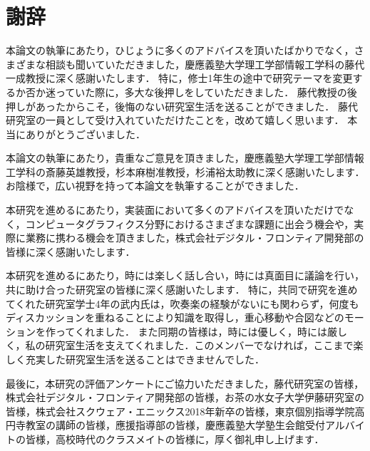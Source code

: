 \chapter*{謝辞}
\label{chap:thanks}
%
%
本論文の執筆にあたり，ひじょうに多くのアドバイスを頂いたばかりでなく，さまざまな相談も聞いていただきました，慶應義塾大学理工学部情報工学科の藤代一成教授に深く感謝いたします．
特に，修士1年生の途中で研究テーマを変更するか否か迷っていた際に，多大な後押しをしていただきました．
藤代教授の後押しがあったからこそ，後悔のない研究室生活を送ることができました．
藤代研究室の一員として受け入れていただけたことを，改めて嬉しく思います．
本当にありがとうございました．\\
\par
本論文の執筆にあたり，貴重なご意見を頂きました，慶應義塾大学理工学部情報工学科の斎藤英雄教授，杉本麻樹准教授，杉浦裕太助教に深く感謝いたします．
お陰様で，広い視野を持って本論文を執筆することができました．\\
\par
本研究を進めるにあたり，実装面において多くのアドバイスを頂いただけでなく，コンピュータグラフィクス分野におけるさまざまな課題に出会う機会や，実際に業務に携わる機会を頂きました，株式会社デジタル・フロンティア開発部の皆様に深く感謝いたします．\\
\par
本研究を進めるにあたり，時には楽しく話し合い，時には真面目に議論を行い，共に助け合った研究室の皆様に深く感謝いたします．
特に，共同で研究を進めてくれた研究室学士4年の武内氏は，吹奏楽の経験がないにも関わらず，何度もディスカッションを重ねることにより知識を取得し，重心移動や合図などのモーションを作ってくれました．
また同期の皆様は，時には優しく，時には厳しく，私の研究室生活を支えてくれました．このメンバーでなければ，ここまで楽しく充実した研究室生活を送ることはできませんでした．\\
\par
最後に，本研究の評価アンケートにご協力いただきました，藤代研究室の皆様，株式会社デジタル・フロンティア開発部の皆様，お茶の水女子大学伊藤研究室の皆様，株式会社スクウェア・エニックス2018年新卒の皆様，東京個別指導学院高円寺教室の講師の皆様，應援指導部の皆様，慶應義塾大学塾生会館受付アルバイトの皆様，高校時代のクラスメイトの皆様に，厚く御礼申し上げます．